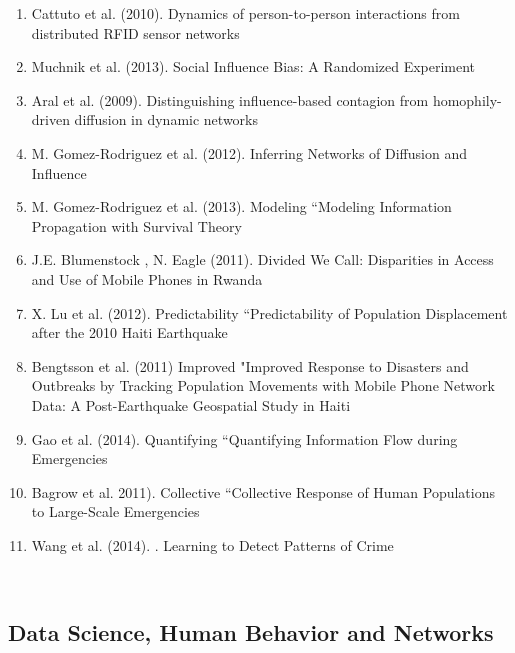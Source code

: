 \begin{enumerate}
\item Cattuto et al. (2010).  Dynamics of person-to-person interactions from distributed RFID sensor networks\cite{Cattuto_2010}   
\item Muchnik et al. (2013).  Social Influence Bias: A Randomized Experiment\cite{Muchnik_2013}  
\item Aral et al. (2009).  Distinguishing influence-based contagion from homophily-driven diffusion in dynamic networks\cite{Aral_2009}   
\item M. Gomez-Rodriguez et al. (2012).  Inferring Networks of Diffusion and Influence\cite{Gomez_Rodriguez_2012}   
\item  M. Gomez-Rodriguez et al. (2013). Modeling “Modeling  Information Propagation with Survival Theory\cite{rodriguez2013modeling} 
\item J.E. Blumenstock , N. Eagle (2011).  Divided We Call: Disparities in Access and Use of Mobile Phones in Rwanda\cite{blumenstock2012divided}   
\item  X. Lu et al. (2012). Predictability “Predictability  of Population Displacement after the 2010 Haiti Earthquake\cite{Lu_2012}   
\item  Bengtsson et al. (2011) Improved "Improved  Response to Disasters and Outbreaks by Tracking Population Movements with Mobile Phone Network Data: A Post-Earthquake Geospatial Study in Haiti\cite{Bengtsson_2011}  
\item  Gao et al. (2014). Quantifying “Quantifying  Information Flow during Emergencies\cite{Gao_2014}   
\item  Bagrow et al. 2011). Collective “Collective  Response of Human Populations to Large-Scale Emergencies\cite{Bagrow_2011}  \item  Wang et al. (2014). .  Learning to Detect Patterns of Crime\cite{Wang_2013}   

\end{enumerate}  
\\  \subsection{Data Science, Human Behavior and Networks}  
